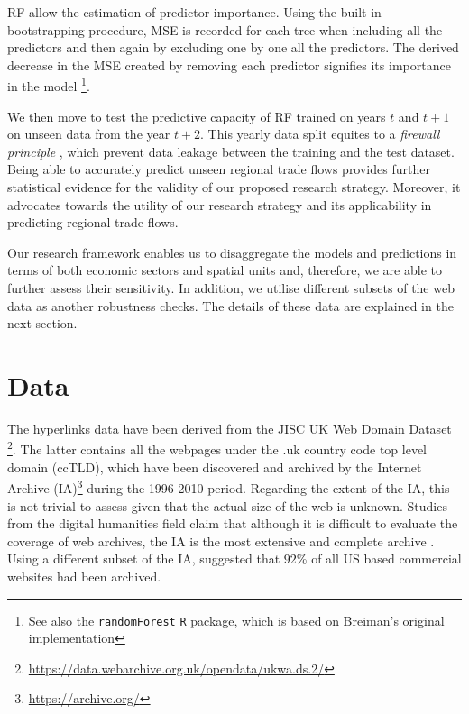 \documentclass[]{interact}
\theoremstyle{plain}%
\theoremstyle{definition}
\theoremstyle{remark}
\begin{document}
RF allow the estimation of predictor importance. Using the built-in
bootstrapping procedure, MSE is recorded for each tree when including
all the predictors and then again by excluding one by one all the
predictors. The derived decrease in the MSE created by removing each
predictor signifies its importance in the model
\citep{breiman2001random}\footnote{See also the \texttt{randomForest}
  \texttt{R} package, which is based on Breiman's
  \citeyearpar{breiman2001random} original implementation}.

We then move to test the predictive capacity of RF trained on years
\(t\) and \(t + 1\) on unseen data from the year \(t + 2\). This yearly
data split equites to a \emph{firewall principle}
\citep{mullainathan2017machine}, which prevent data leakage between the
training and the test dataset. Being able to accurately predict unseen
regional trade flows provides further statistical evidence for the
validity of our proposed research strategy. Moreover, it advocates
towards the utility of our research strategy and its applicability in
predicting regional trade flows.

Our research framework enables us to disaggregate the models and
predictions in terms of both economic sectors and spatial units and,
therefore, we are able to further assess their sensitivity. In addition,
we utilise different subsets of the web data as another robustness
checks. The details of these data are explained in the next section.

\hypertarget{sec:4}{%
\section{Data}\label{sec:4}}

The hyperlinks data have been derived from the JISC UK Web Domain
Dataset \citep{ukwebarchive}\footnote{\url{https://data.webarchive.org.uk/opendata/ukwa.ds.2/}}.
The latter contains all the webpages under the .uk country code top
level domain (ccTLD), which have been discovered and archived by the
Internet Archive (IA)\footnote{\url{https://archive.org/}} during the
1996-2010 period. Regarding the extent of the IA, this is not trivial to
assess given that the actual size of the web is unknown. Studies from
the digital humanities field claim that although it is difficult to
evaluate the coverage of web archives, the IA is the most extensive and
complete archive \citep{Ainsworth2011, Holzmann2016}. Using a different
subset of the IA, \citet{thelwall2004fair} suggested that \(92\)\% of
all US based commercial websites had been archived.
\end{document}
